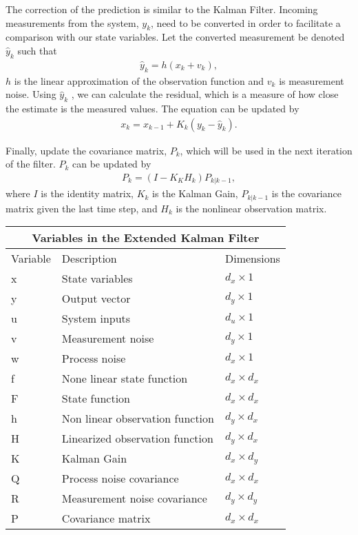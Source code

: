 \begin{enumerate}
    
 
    \noindent  The correction of the prediction is similar to the Kalman Filter. Incoming measurements from the system, $y_k$, need to be converted in order to facilitate a comparison with our state variables. Let the converted measurement be denoted $\hat y_k$ such that 
    \begin{align*}
        \hat y_k = h( x_k + v_k ),
    \end{align*}
   $h$ is the linear approximation of the observation function and $v_k$ is measurement noise. Using $\hat y_k$ , we can calculate the residual, which is a measure of how close the estimate is the measured values. The equation can be updated by 
     \begin{align*} 
        x_k = x_{k - 1} + K_k(y_k - \hat y_k).
    \end{align*}
    
    
    \noindent Finally, update the covariance matrix, $P_k $, which will be used in the next iteration of the filter. $P_k $ can be updated by
    \begin{align*} 
        P_k = (I - K_K H_k) P_{k | k-1},
    \end{align*}
    where $I$ is the identity matrix, $K_k$ is the Kalman Gain, $P_{k | k-1}$ is the covariance matrix given the last time step, and $H_k$ is the nonlinear observation matrix.
\end{enumerate} 

\newpage

\begin{center}
    
\centering
\begin{tabular}{ |p{2cm}||p{5cm}|p{2cm}| }
    \hline
    \multicolumn{3}{|c|}{Variables in the Extended Kalman Filter } \\ 
    \hline
    Variable & Description & Dimensions \\
    \hline
   x & State variables  & $d_x \times 1$ \\
    y & Output vector  & $d_y \times 1$ \\
    u & System inputs  & $d_u \times 1$\\
    v & Measurement noise & $d_y \times 1$\\
    w & Process noise & $d_x \times 1$\\
    f & None linear state function  & $d_x \times d_x $  \\ 
    F & State function  & $d_x \times d_x $  \\ 
    h & Non linear observation function & $d_y \times d_x$\\
    H & Linearized observation function & $d_y \times d_x$\\
    K & Kalman Gain  & $d_x \times d_y$\\
    Q & Process noise covariance  & $d_x \times d_x$ \\
    R & Measurement noise covariance &  $d_y \times d_y$\\
    P & Covariance matrix & $d_x \times d_x $  \\ 
    \hline
\end{tabular}
\end{center}
